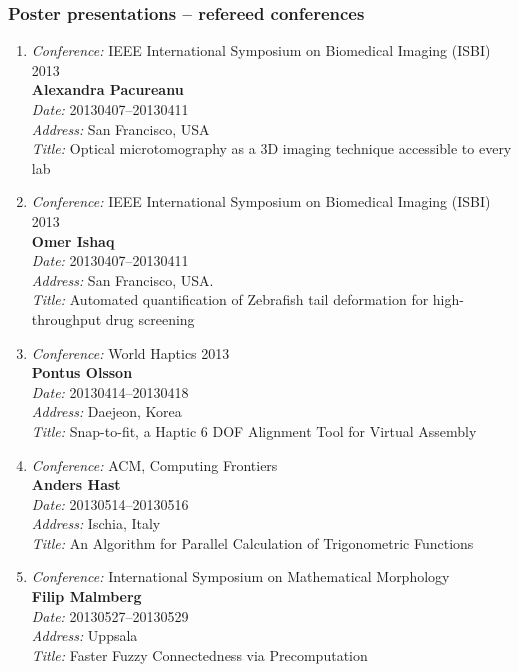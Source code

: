 \subsubsection{ Poster presentations -- refereed conferences}
\begin{enumerate}
\item 
{\em Conference:} IEEE International Symposium on Biomedical Imaging (ISBI) 2013~\\
{\bf Alexandra Pacureanu}~\\
{\em Date:} 20130407--20130411~\\
{\em Address:} San Francisco, USA~\\
{\em Title:} Optical microtomography as a 3D imaging technique accessible to every lab

\item 
{\em Conference:} IEEE International Symposium on Biomedical Imaging (ISBI) 2013~\\
{\bf Omer Ishaq}~\\
{\em Date:} 20130407--20130411~\\
{\em Address:} San Francisco, USA.~\\
{\em Title:} Automated quantification of Zebrafish tail deformation for high-throughput drug screening

\item 
{\em Conference:} World Haptics 2013~\\
{\bf Pontus Olsson}~\\
{\em Date:} 20130414--20130418~\\
{\em Address:} Daejeon, Korea~\\
{\em Title:} Snap-to-fit, a Haptic 6 DOF Alignment Tool for Virtual Assembly

\item 
{\em Conference:} ACM, Computing Frontiers~\\
{\bf Anders Hast}~\\
{\em Date:} 20130514--20130516~\\
{\em Address:} Ischia, Italy~\\
{\em Title:} An Algorithm for Parallel Calculation of Trigonometric Functions


\item 
{\em Conference:} International Symposium on Mathematical Morphology~\\
{\bf Filip Malmberg}~\\
{\em Date:} 20130527--20130529~\\
{\em Address:} Uppsala~\\
{\em Title:} Faster Fuzzy Connectedness via Precomputation


\end{enumerate}
